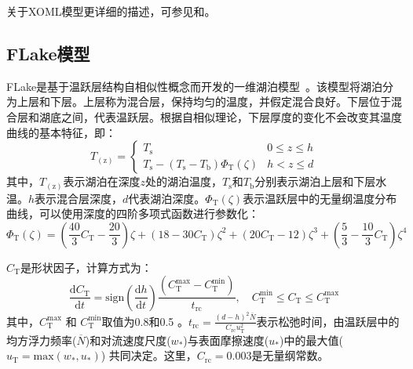 关于XOML模型更详细的描述，可参见\citet{ling2015multilevel}和\citet{noh2002simulation, noh2011prediction}。

\subsection{FLake模型}\label{FLake模型}
\label{FLake Model}

FLake是基于温跃层结构自相似性概念而开发的一维湖泊模型~\citep{mironovCOSMOTechnicalReport2008a}。该模型将湖泊分为上层和下层。上层称为混合层，保持均匀的温度，并假定混合良好。下层位于混合层和湖底之间，代表温跃层。根据自相似理论，下层厚度的变化不会改变其温度曲线的基本特征，即：
\begin{equation}\label{flaketmp}
    T_{\mathrm{(z)}}=\left\{\begin{array}{ll} T_{\mathrm{s}} & 0 \leqslant z \leqslant h  \\ T_{\mathrm{s}} - \left(T_{\mathrm{s}}-T_{\mathrm{b}} \right) \Phi_{\mathrm{T}} \left(\zeta \right) & h < z \leqslant d \end{array}\right.
\end{equation}
其中，$T_{\mathrm{(z)}}$表示湖泊在深度$z$处的湖泊温度，$T_{\mathrm{s}}$和$T_{\mathrm{b}}$分别表示湖泊上层和下层水温。$h$表示混合层深度，$d$代表湖泊深度。$\Phi_{\mathrm{T}} \left(\zeta \right)$表示温跃层中的无量纲温度分布曲线，可以使用深度的四阶多项式函数进行参数化：
\begin{equation}
    \Phi_{\mathrm{T}} \left(\zeta \right) = \left( \frac{40}{3} C_{\mathrm{T}} - \frac{20}{3} \right) \zeta + (18 - 30 C_{\mathrm{T}}) \zeta^2 + (20 C_{\mathrm{T}} - 12) \zeta^3 + \left( \frac{5}{3} - \frac{10}{3} C_{\mathrm{T}} \right) \zeta^4
\end{equation}

$C_{\mathrm{T}}$是形状因子，计算方式为：
\begin{equation}
    \frac{\mathrm{d} C_{\mathrm{T}}}{\mathrm{d} t} = \mathrm{sign} \left( \frac{\mathrm{d} h}{\mathrm{d} t} \right) \frac{ \left( C_{\mathrm{T}}^{\mathrm{max}} - C_{\mathrm{T}}^{\mathrm{min}} \right) }{t_{\mathrm{rc}}}, \quad C_{\mathrm{T}}^{\min} \leq C_{\mathrm{T}} \leq C_{\mathrm{T}}^{\mathrm{max}}
\end{equation}
其中，$C_{\mathrm{T}}^{\text{max}}$ 和 $C_{\mathrm{T}}^{\text{min}}$取值为0.8和0.5
。$t_{\mathrm{rc}} = \frac{\left( d - h \right) ^ {\mathrm{2}} \overline{N}}{C_{\mathrm{rc}} u_{\mathrm{T}} ^ {\mathrm{2}}}$表示松弛时间，由温跃层中的均方浮力频率($\overline{N}$)和对流速度尺度($w_*$)与表面摩擦速度($u_*$)中的最大值($u_{\mathrm{T}}=\mathrm{max}\left(w_*, u_* \right)$) 共同决定。这里，$C_{\mathrm{rc}} = 0.003$是无量纲常数。

